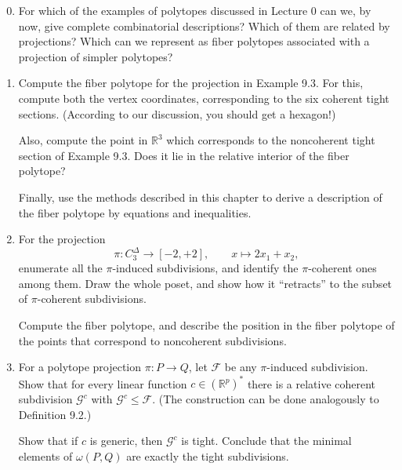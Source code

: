 \documentclass{article}
\begin{document}
\begin{enumerate}
\setcounter{enumi}{-1}
\renewcommand{\labelenumi}{9.\arabic{enumi}}
\item For which of the examples of polytopes discussed in Lecture 0 can we, by now, give complete combinatorial descriptions? Which of them are related by projections? Which can we represent as fiber polytopes associated with a projection of simpler polytopes?

\item Compute the fiber polytope for the projection in Example 9.3. For this, compute both the vertex coordinates, corresponding to the six coherent tight sections. (According to our discussion, you should get a hexagon!)

Also, compute the point in $\mathbb{R}^3$ which corresponds to the noncoherent tight section of Example 9.3. Does it lie in the relative interior of the fiber polytope?

Finally, use the methods described in this chapter to derive a description of the fiber polytope by equations and inequalities.

\item For the projection
\[
\pi : C_3^\Delta \longrightarrow [-2,+2], \qquad x \longmapsto 2x_1 + x_2,
\]
enumerate all the $\pi$-induced subdivisions, and identify the $\pi$-coherent ones among them. Draw the whole poset, and show how it ``retracts'' to the subset of $\pi$-coherent subdivisions.

Compute the fiber polytope, and describe the position in the fiber polytope of the points that correspond to noncoherent subdivisions.

\item For a polytope projection $\pi : P \longrightarrow Q$, let $\mathcal{F}$ be any $\pi$-induced subdivision. Show that for every linear function $c \in (\mathbb{R}^p)^{*}$ there is a relative coherent subdivision $\mathcal{G}^{c}$ with $\mathcal{G}^{c} \le \mathcal{F}$. (The construction can be done analogously to Definition 9.2.)

Show that if $c$ is generic, then $\mathcal{G}^{c}$ is tight. Conclude that the minimal elements of $\omega(P,Q)$ are exactly the tight subdivisions.


\end{enumerate}
\end{document}
